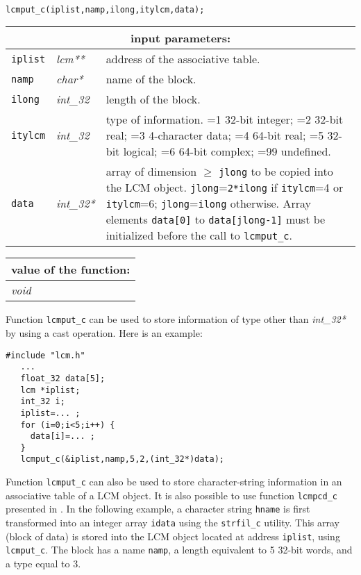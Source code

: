 \begin{verbatim}

lcmput_c(iplist,namp,ilong,itylcm,data);
\end{verbatim}

\noindent
\begin{tabular}{|p{1.5cm}|p{2cm}|p{11cm}|}
\hline
\multicolumn{3}{|c|}{\bf input parameters:} \\
\hline
{\tt iplist} & {\it lcm**} & address of the associative table. \\
\hline
{\tt namp} & {\it char*} & name of the block. \\
\hline
{\tt ilong} & {\it int\_32} & length of the block. \\
\hline
{\tt itylcm} & {\it int\_32} & type of information. =1 32-bit integer; 
                                    =2 32-bit real; =3 4-character data; 
				    =4 64-bit real; =5 32-bit logical; =6 64-bit complex; =99 undefined. \\
\hline
{\tt data} & {\it int\_32*} & array of dimension $\ge$ {\tt jlong} to be copied into the LCM object. {\tt jlong}={\tt 2*ilong} if {\tt itylcm}=4 or {\tt itylcm}=6;
                                   {\tt jlong}={\tt ilong} otherwise.
                                   Array elements {\tt data[0]} to {\tt data[jlong-1]}
                                   must be initialized before the call to {\tt lcmput\_c}. \\
\hline
\end{tabular}

\vskip 0.8cm

\noindent
\begin{tabular}{|p{4.0cm}|p{11cm}|}
\hline
\multicolumn{2}{|c|}{\bf value of the function:} \\
\hline
{\it void} &  \\
\hline
\end{tabular}

\vskip 0.4cm

Function {\tt lcmput\_c} can be used to store information of type other than {\it int\_32*} by using a
cast operation. Here is an example:

\begin{verbatim}
#include "lcm.h"
   ...
   float_32 data[5];
   lcm *iplist;
   int_32 i;
   iplist=... ;
   for (i=0;i<5;i++) {
     data[i]=... ;
   }
   lcmput_c(&iplist,namp,5,2,(int_32*)data);
\end{verbatim}

\vskip 0.2cm

Function {\tt lcmput\_c} can also be used to store character-string information in an associative table
of a LCM object. It is also possible to use function {\tt lcmpcd\_c} presented in . In the
following example, a character string {\tt hname} is first transformed into an integer array {\tt idata}
using the {\tt strfil\_c} utility. This array (block of data) is stored into the LCM object located at
address {\tt iplist}, using {\tt lcmput\_c}. The block has a name {\tt namp}, a length equivalent
to 5 32-bit words, and a type equal to 3.

